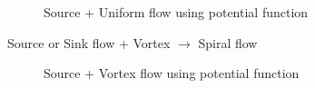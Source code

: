 \begin{figure}[h]
\begin{center}
\end{center}
\caption{Source + Uniform flow using potential function}
\label{planarsourceuniformflow}
\end{figure}


Source or Sink flow + Vortex $\rightarrow$ Spiral flow
\begin{figure}[h]
\begin{center}
\end{center}
\caption{Source + Vortex flow using potential function}
\label{planarsourcevortexflow}
\end{figure}


